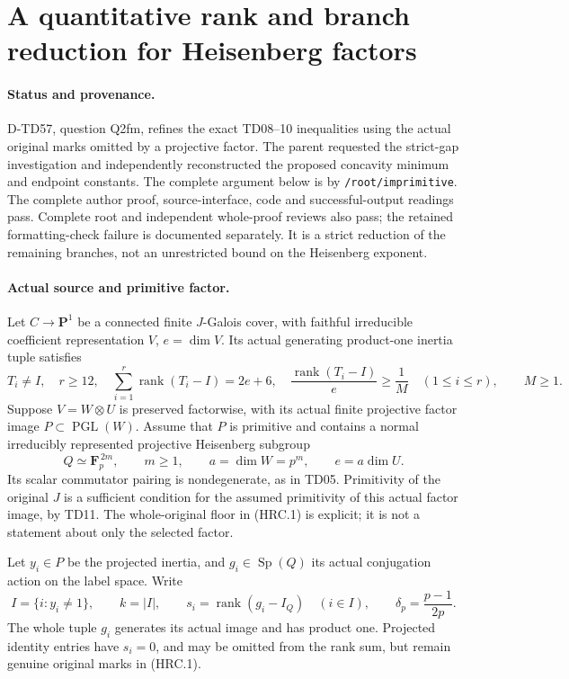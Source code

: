 \section{A quantitative rank and branch reduction for Heisenberg factors}
\label{sec:heisenberg-rank-concavity}

\paragraph{Status and provenance.}
D-TD57, question Q2fm, refines the exact TD08--10 inequalities
using the actual original marks omitted by a projective factor.
The parent requested the strict-gap investigation and independently
reconstructed the proposed concavity minimum and endpoint constants.
The complete argument below is by \texttt{/root/imprimitive}.
The complete author proof, source-interface, code and successful-output
readings pass.  Complete root and independent whole-proof reviews also
pass; the retained formatting-check failure is documented separately.
It is a strict reduction of the remaining branches, not an unrestricted
bound on the Heisenberg exponent.

\paragraph{Actual source and primitive factor.}
Let \(C\to\mathbf P^1\) be a connected finite \(J\)-Galois cover, with
faithful irreducible coefficient representation \(V\), \(e=\dim V\).
Its actual generating product-one inertia tuple satisfies
\[
 T_i\ne I,\quad r\ge12,\quad
 \sum_{i=1}^r\operatorname{rank}(T_i-I)=2e+6,\quad
 \frac{\operatorname{rank}(T_i-I)}e\ge\frac1M
 \quad(1\le i\le r),\qquad M\ge1.
 \tag{HRC.1}
\]
Suppose \(V=W\otimes U\) is preserved factorwise, with its actual finite
projective factor image \(P\subset\operatorname{PGL}(W)\).
Assume that \(P\) is primitive and contains a normal irreducibly
represented projective Heisenberg subgroup
\[
 Q\simeq\mathbf F_p^{\,2m},\qquad m\ge1,\qquad
 a=\dim W=p^m,\qquad e=a\dim U.
 \tag{HRC.2}
\]
Its scalar commutator pairing is nondegenerate, as in TD05.
Primitivity of the original \(J\) is a sufficient condition for
the assumed primitivity of this actual factor image, by TD11.
The whole-original floor in (HRC.1) is explicit; it is not a
statement about only the selected factor.

Let \(y_i\in P\) be the projected inertia, and \(g_i\in\operatorname{Sp}(Q)\)
its actual conjugation action on the label space.  Write
\[
 I=\{i:y_i\ne1\},\qquad k=|I|,\qquad
 s_i=\operatorname{rank}(g_i-I_Q)\quad(i\in I),\qquad
 \delta_p=\frac{p-1}{2p}.
 \tag{HRC.3}
\]
The whole tuple \(g_i\) generates its actual image and has product one.
Projected identity entries have \(s_i=0\), and may be omitted from
the rank sum, but remain genuine original marks in (HRC.1).


